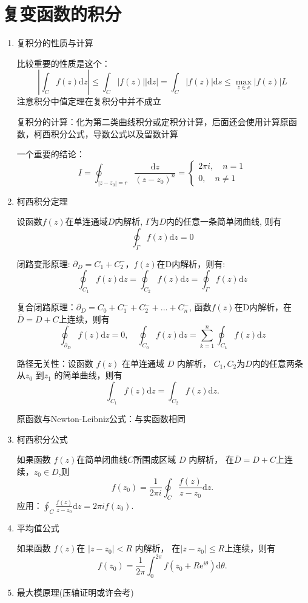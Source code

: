 \documentclass[a4paper,11pt,UTF8]{article}
\begin{document}
\section{复变函数的积分}
\begin{enumerate}
	\item 复积分的性质与计算
	
	比较重要的性质是这个：$$
	\left|\int_Cf(z)\mathrm{d}z\right|\leq\int_C|f(z)||\mathrm{d}z|=\int_C|f(z)|\mathrm{d}s\leq \max_{z\in c}|f(z)| L
	$$
	注意积分中值定理在复积分中并不成立
	
	复积分的计算：化为第二类曲线积分或定积分计算，后面还会使用计算原函数，柯西积分公式，导数公式以及留数计算
	
	一个重要的结论：$$I=\oint_{|z-z_0|=r}\frac{\mathrm{d}z}{(z-z_0)^n}=\begin{cases}
		2\pi i,\quad n=1 \\0, \quad n\neq1
	\end{cases}$$
	\item 柯西积分定理
	
	设函数$f(z)$在单连通域$D$内解析, $\Gamma$为$D$内的任意一条简单闭曲线, 则有$$\displaystyle\oint_{\Gamma}f(z)\mathrm{d}z=0$$
	
	闭路变形原理: $\partial_D=C_1+C_2^-$，$f(z)$在D内解析，则有:$$\displaystyle\oint_{C_1}f(z)\mathrm{d}z=\oint_{C_2}f(z)\mathrm{d}z=\oint_\Gamma f(z)\mathrm{d}z$$
	
	复合闭路原理：$\partial_D=C_0+C_1^-+C_2^-+...+C_n^-$, 函数$f(z)$在D内解析，在$\overline{D}=D+C$上连续，则有
	$$\oint_{\partial_D}f(z)\mathrm{d}z=0,\quad \oint_{C_0}f(z)\mathrm{d}z=\sum_{k=1}^{n}\oint_{C_k}f(z)\mathrm{d}z$$
	
	路径无关性：设函数 $f(z)$ 在单连通域 $D$ 内解析， $C_1,C_2$为$D$内的任意两条从$z_0$ 到$z_1$ 的简单曲线，则有
	$$
	\int_{C_1}f(z)\mathrm{d}z=\int_{C_2}f(z)\mathrm{d}z.
	$$
	
	原函数与Newton-Leibniz公式：与实函数相同
	\item 柯西积分公式
	
	如果函数 $f(z)$在简单闭曲线$C$所围成区域 $D$ 内解析， 在$\overline{D}=D+C$上连续，$z_0\in D$,则
	$$
	f(z_0)=\frac1{2\pi i}\oint_C\frac{f(z)}{z-z_0}\mathrm{d}z.
	$$
	应用：$
	\displaystyle\oint_C\frac{f(z)}{z-z_0}\mathrm{d}z=2\pi if(z_0).
	$
	\item 平均值公式
	
	如果函数 $f(z)$在 $|z-z_0|<R$ 内解析， 在$|z-z_0|\leq R$上连续，则有
	$$
	f(z_0)=\frac1{2\pi}\int_0^{2\pi}f(z_0+R\mathrm{e}^{i\theta})\mathrm{d}\theta.
	$$
	\item 最大模原理(压轴证明或许会考)
	

\end{enumerate}
\end{document}
